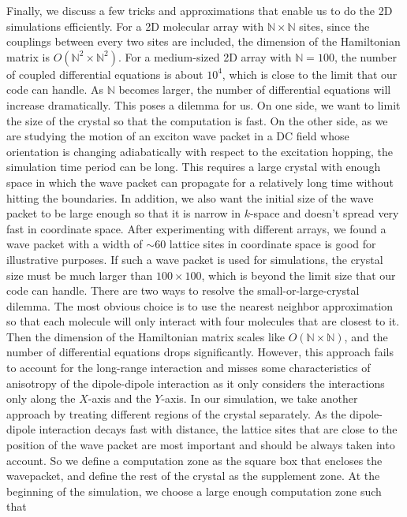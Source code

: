 Finally, we discuss a few tricks and approximations that enable us to do the 2D simulations efficiently. For a 2D 
molecular array
with $\mathbb{N}\times\mathbb{N}$ sites, since the couplings between every two sites are included, the dimension 
of the Hamiltonian matrix is $O(\mathbb{N}^2 \times \mathbb{N}^2)$. For a medium-sized 2D array 
with $\mathbb{N}=100$, the number of coupled differential equations is about $10^4$, which is close to the limit 
that our code can handle. As $\mathbb{N}$ becomes larger, the number of differential equations will increase 
dramatically. This poses a dilemma for us. On one side, we want to limit the size of the crystal so that the computation 
is fast. On the other side,  as we are studying the motion of an exciton wave packet in a DC field whose orientation 
is changing adiabatically with respect to the excitation hopping, the simulation time period can be long. This requires a 
large crystal with enough space in which the wave packet can propagate for a relatively long time without hitting the 
boundaries.
In addition, we also want the initial size of the wave packet to be large enough so that it is narrow in $k$-space
and doesn't spread very fast in coordinate space. After experimenting with different arrays, we found a wave 
packet with a width of $\sim 60$ lattice sites in coordinate space is good for illustrative purposes. If such a wave packet 
is used for simulations, the crystal size must be much larger than $100 \times 100$, which is beyond the limit size
 that our code can handle.  There are two ways to resolve the small-or-large-crystal dilemma.
 The most obvious choice is to use the nearest neighbor approximation so that each molecule will only interact with
four molecules that are closest to it. Then the dimension of the Hamiltonian matrix scales like 
$O(\mathbb{N}\times \mathbb{N})$, and the number  of differential equations drops significantly. However, this 
approach fails to account for the long-range interaction and misses some characteristics of anisotropy of the dipole-dipole
interaction as it only considers the interactions only along the $X$-axis and the $Y$-axis. In our simulation, we take 
another approach by treating different regions of the crystal separately. 
As the dipole-dipole interaction decays fast with distance, the lattice sites that are close to the position of the wave 
packet are most important and should be always taken into account. So we define a computation zone as the 
square box that encloses the wavepacket, and define the rest of the crystal as
the supplement zone. At the beginning of  the simulation, we choose a large enough computation zone such that
